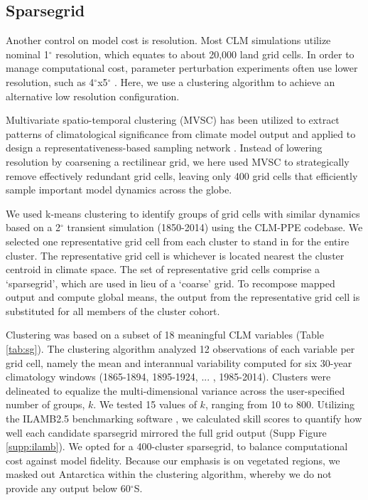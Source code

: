 \documentclass[draft]{agujournal2019}
\begin{document}
\subsection{Sparsegrid}
\label{sect:sg}
Another control on model cost is resolution. Most CLM simulations utilize nominal 1$^\circ$ resolution, which equates to about 20,000 land grid cells. In order to manage computational cost, parameter perturbation experiments often use lower resolution, such as 4$^\circ$x5$^\circ$ \cite{dagon2020}. Here, we use a clustering algorithm to achieve an alternative low resolution configuration.

Multivariate spatio-temporal clustering (MVSC) has been utilized to extract patterns of climatological significance from climate model output \cite{hoffman2005} and applied to design a representativeness-based sampling network \cite{hoffman2013}. Instead of lowering resolution by coarsening a rectilinear grid, we here used MVSC to strategically remove effectively redundant grid cells, leaving only 400 grid cells that efficiently sample important model dynamics across the globe.

We used k-means clustering to identify groups of grid cells with similar dynamics based on a 2$^\circ$ transient simulation (1850-2014) using the CLM-PPE codebase. We selected one representative grid cell from each cluster to stand in for the entire cluster. The representative grid cell is whichever is located nearest the cluster centroid in climate space. The set of representative grid cells comprise a `sparsegrid', which are used in lieu of a `coarse' grid. To recompose mapped output and compute global means, the output from the representative grid cell is substituted for all members of the cluster cohort.

Clustering was based on a subset of 18 meaningful CLM variables (Table \ref{tab:sg}). The clustering algorithm analyzed 12 observations of each variable per grid cell, namely the mean and interannual variability computed for six 30-year climatology windows (1865-1894, 1895-1924, ... , 1985-2014). Clusters were delineated to equalize the multi-dimensional variance across the user-specified number of groups, $k$. We tested 15 values of $k$, ranging from 10 to 800. Utilizing the ILAMB2.5 benchmarking software \cite{collier2018}, we calculated skill scores to quantify how well each candidate sparsegrid mirrored the full grid output (Supp Figure \ref{supp:ilamb}). We opted for a 400-cluster sparsegrid, to balance computational cost against model fidelity. Because our emphasis is on vegetated regions, we masked out Antarctica within the clustering algorithm, whereby we do not provide any output below 60$^\circ$S.
\end{document}
